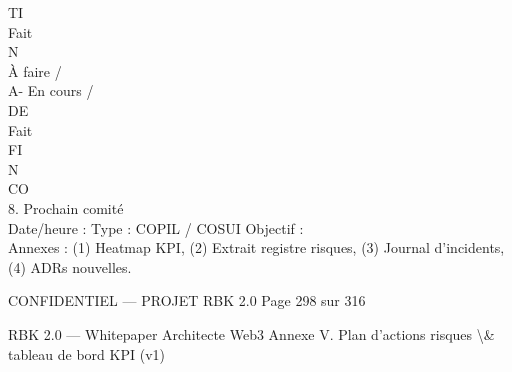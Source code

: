 \vspace{0.5em}
\vspace{0.5em}
\vspace{0.5em}
TI\\
Fait\\
\vspace{0.5em}
\vspace{0.5em}
\vspace{0.5em}
\vspace{0.5em}
N\\
À faire /\\
A-                                                                                                En cours /\\
\vspace{0.5em}
\vspace{0.5em}
\vspace{0.5em}
\vspace{0.5em}
DE\\
Fait\\
\vspace{0.5em}
\vspace{0.5em}
\vspace{0.5em}
\vspace{0.5em}
FI\\
N\\
CO\\
8. Prochain comité\\
Date/heure :                                      Type : COPIL / COSUI     Objectif :\\
\vspace{0.5em}
Annexes : (1) Heatmap KPI, (2) Extrait registre risques, (3) Journal d’incidents, (4) ADRs nouvelles.\\
\vspace{0.5em}
\vspace{0.5em}
\vspace{0.5em}
\vspace{0.5em}
\begin{confidential}CONFIDENTIEL — PROJET RBK 2.0                                                              Page 298 sur 316\end{confidential}
RBK 2.0 — Whitepaper Architecte Web3                                                                                      Annexe V. Plan d’actions risques \textbackslash{}& tableau de bord KPI (v1)\\
\vspace{0.5em}
\vspace{0.5em}
\vspace{0.5em}
